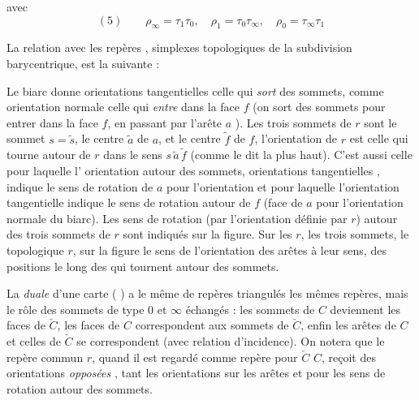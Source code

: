 \documentclass[11pt,a4paper]{article}
\begin{document}
avec
\[
  (5)\qquad \rho_{\infty} = \tau_{1}\tau_{0}, \quad \rho_{1} = \tau_{0}\tau_{\infty}, \quad \rho_{0} = \tau_{\infty}\tau_{1}
\]

La relation avec les \og repères \fg,  simplexes topologiques de la subdivision barycentrique, est la suivante :


Le biarc  donne  orientations tangentielles celle qui \emph{sort} des sommets, comme orientation normale celle qui \emph{entre} dans la face $f$ (\og on sort des sommets pour entrer dans la face $f$, en passant par l'arête $a$ \fg). Les trois sommets de $r$ sont le sommet $s = \tilde s$, le \og centre \fg{} $\tilde a$ de $a$, et le \og centre \fg{} $\tilde f$ de $f$, l'orientation de $r$ est celle qui tourne autour de $r$ dans le sens $s\,\tilde a\,\tilde f$ (comme le dit la  plus haut). C'est aussi celle pour laquelle l'\struck{\ill{}} orientation  \ill{} \ill{} autour des sommets, \ill{} orientations tangentielles \ill{}, indique le sens de rotation \og \ill{} \fg{} de $a$ pour l'orientation \ill{} et pour laquelle l'orientation tangentielle indique le sens de rotation autour de $f$ (\og face  \fg{} de $a$ pour l'orientation normale du biarc). Les sens de rotation \og {} \fg{} (par l'orientation définie par $r$) autour des trois sommets de $r$ sont indiqués sur la figure. Sur les  $r$, \ill{} les trois sommets, le   topologique $r$, \ill{} sur la figure le sens de l'orientation \ill{} des arêtes  \ill{} à leur sens, \ill{} des positions le long des \ill{} qui tournent autour des sommets.

La   \emph{duale} d'une carte (\struck{\ill{}} ) a le même  de repères \og triangulés \fg{}  les mêmes repères, mais le rôle des sommets de type $0$ et $\infty$ échangés : les sommets de $C$ deviennent   les faces de $\check C$, les faces de $C$ correspondent aux sommets de $\check C$, enfin les arêtes de $C$ et celles de $\check C$ se correspondent (avec relation d'incidence). On notera que le repère commun $r$, \struck{\ill{}} quand il est regardé comme repère pour $\check C$  \struck{\ill{}} $C$, reçoit des orientations \og \emph{opposées} \fg, tant  les orientations  sur les arêtes et pour les sens de rotation autour des sommets.
\end{document}
